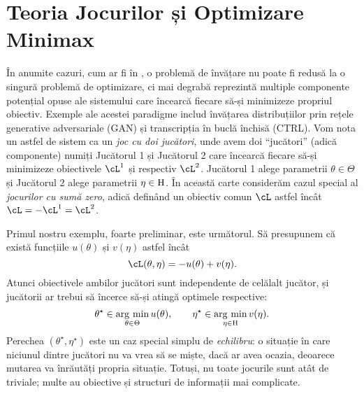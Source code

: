 \documentclass[../../book-main_ro.tex]{subfiles}
\begin{document}
        
        
        
        


















\section{Teoria Jocurilor și Optimizare Minimax} \label{sec:minimax}\label{sec:game_theory}

În anumite cazuri, cum ar fi în , o problemă de învățare nu poate fi redusă la o singură problemă de optimizare, ci mai degrabă reprezintă multiple componente potențial opuse ale sistemului care încearcă fiecare să-și minimizeze propriul obiectiv. Exemple ale acestei paradigme includ învățarea distribuțiilor prin rețele generative adversariale (GAN) și transcripția în buclă închisă (CTRL). Vom nota un astfel de sistem ca un \textit{joc cu doi jucători}, unde avem doi ``jucători'' (adică componente) numiți Jucătorul 1 și Jucătorul 2 care încearcă fiecare să-și minimizeze obiectivele \(\cL^{1}\) și respectiv \(\cL^{2}\). Jucătorul 1 alege parametrii \(\theta \in \Theta\) și Jucătorul 2 alege parametrii \(\eta \in \mathrm{H}\). În această carte considerăm cazul special al \textit{jocurilor cu sumă zero}, adică definând un obiectiv comun \(\cL\) astfel încât \(\cL = -\cL^{1} = \cL^{2}\).

Primul nostru exemplu, foarte preliminar, este următorul. Să presupunem că există funcțiile \(u(\theta)\) și \(v(\eta)\) astfel încât 
\begin{equation}
    \cL(\theta, \eta) = -u(\theta) + v(\eta).
\end{equation}
Atunci obiectivele ambilor jucători sunt independente de celălalt jucător, și jucătorii ar trebui să încerce să-și atingă optimele respective:
\begin{equation}
    \theta^{\star} \in \operatorname*{arg\ min}_{\theta \in \Theta}u(\theta), \qquad \eta^{\star} \in \operatorname*{arg\ min}_{\eta \in \mathrm{H}}v(\eta).
\end{equation}
Perechea \((\theta^{\star}, \eta^{\star})\) este un caz special simplu de \textit{echilibru}: o situație în care niciunul dintre jucători nu va vrea să se miște, dacă ar avea ocazia, deoarece mutarea va înrăutăți propria situație. Totuși, nu toate jocurile sunt atât de triviale; multe au obiective și structuri de informații mai complicate.
\end{document}
